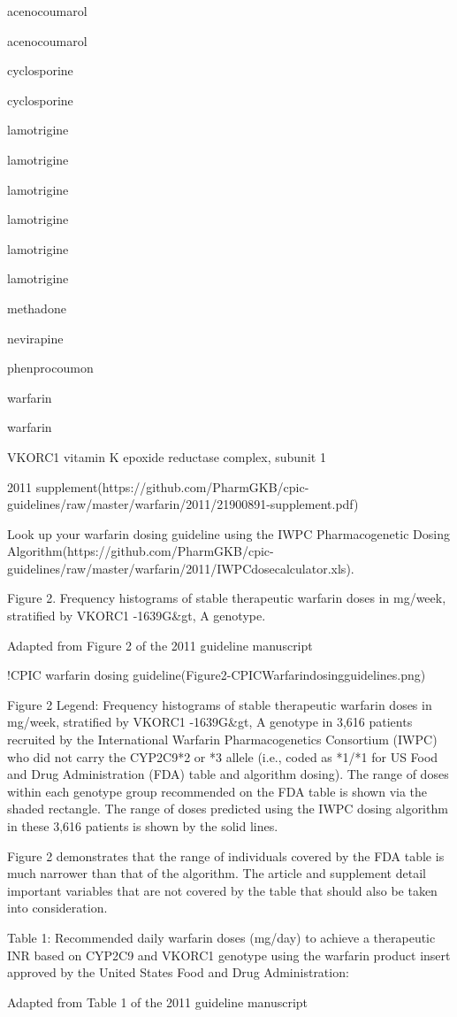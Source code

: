 \documentclass{resume} %
\begin{document}
\begin{rSection}{ acenocoumarol }
\begin{rSection}{ acenocoumarol }
\begin{rSection}{ cyclosporine }
\begin{rSection}{ cyclosporine }
\begin{rSection}{ lamotrigine }
\begin{rSection}{ lamotrigine }
\begin{rSection}{ lamotrigine }
\begin{rSection}{ lamotrigine }
\begin{rSection}{ lamotrigine }
\begin{rSection}{ lamotrigine }
\begin{rSection}{ methadone }
\begin{rSection}{ nevirapine }
\begin{rSection}{ phenprocoumon }
\begin{rSection}{ warfarin }
\begin{rSection}{ warfarin }
\begin{rSubsection}{ VKORC1 }{ vitamin K epoxide reductase complex, subunit 1 }{}{}
\item 2011 supplement(https://github.com/PharmGKB/cpic-guidelines/raw/master/warfarin/2011/21900891-supplement.pdf)
 \newline
\item Look up your warfarin dosing guideline using the IWPC Pharmacogenetic Dosing Algorithm(https://github.com/PharmGKB/cpic-guidelines/raw/master/warfarin/2011/IWPCdosecalculator.xls).
 \newline
\item Figure 2. Frequency histograms of stable therapeutic warfarin doses in mg/week, stratified by VKORC1 -1639G&gt, A genotype.
 \newline
\item Adapted from Figure 2 of the 2011 guideline manuscript
 \newline
\item !CPIC warfarin dosing guideline(Figure2-CPICWarfarindosingguidelines.png)
 \newline
\item Figure 2 Legend: Frequency histograms of stable therapeutic warfarin doses in mg/week, stratified by VKORC1 -1639G&gt, A genotype in 3,616 patients recruited by the International Warfarin Pharmacogenetics Consortium (IWPC) who did not carry the CYP2C9*2 or *3 allele (i.e., coded as *1/*1 for US Food and Drug Administration (FDA) table and algorithm dosing). The range of doses within each genotype group recommended on the FDA table is shown via the shaded rectangle. The range of doses predicted using the IWPC dosing algorithm in these 3,616 patients is shown by the solid lines.
 \newline
\item Figure 2 demonstrates that the range of individuals covered by the FDA table is much narrower than that of the algorithm. The article and supplement detail important variables that are not covered by the table that should also be taken into consideration.
 \newline
\item Table 1: Recommended daily warfarin doses (mg/day) to achieve a therapeutic INR based on CYP2C9 and VKORC1 genotype using the warfarin product insert approved by the United States Food and Drug Administration:
 \newline
\item Adapted from Table 1 of the 2011 guideline manuscript
 \newline

\end{rSubsection}
\end{rSection}
\end{rSection}
\end{rSection}
\end{rSection}
\end{rSection}
\end{rSection}
\end{rSection}
\end{rSection}
\end{rSection}
\end{rSection}
\end{rSection}
\end{rSection}
\end{rSection}
\end{rSection}
\end{rSection}
\end{document}
